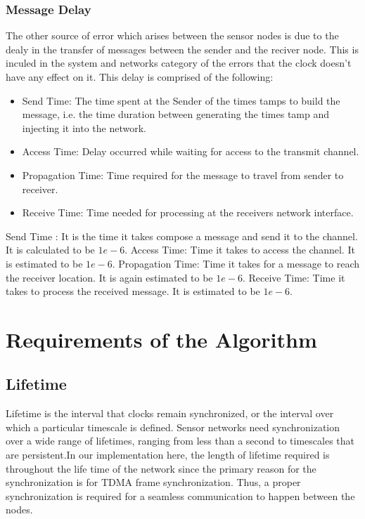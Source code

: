 \documentclass[a4paper,8pt]{report}
\begin{document}
\subsubsection{Message Delay} The other source of error which arises
between the sensor nodes is due to the dealy in the transfer of
messages between the sender and the reciver node. This is inculed in
the system and networks category of the errors that the clock
doesn't have any effect on it. This delay is comprised of the
following:
\begin{itemize}
         \item Send Time: The time spent at the Sender of the times tamps to build the
          message, i.e. the time duration between generating the times tamp and injecting
            it into the network.
         \item Access Time: Delay occurred while waiting for access to the transmit channel.
         \item Propagation Time: Time required for the message to travel from sender to
            receiver.
         \item Receive Time: Time needed for processing at the receivers network interface.
\end{itemize}
Send Time : It is the time it takes compose a message and send it to
the channel. It is calculated to be $1e-6$. \newline Access Time:
Time it takes to access the channel. It is estimated to be $1e-6$.
\newline Propagation Time: Time it takes for a message to reach the
receiver location. It is again estimated to be $1e-6$. Receive Time:
Time it takes to process the received message. It is estimated to be
$1e-6$.
\section{Requirements of the Algorithm}
\subsection{Lifetime}
Lifetime is the interval that clocks remain synchronized, or the
interval over which a particular timescale is defined. Sensor
networks need synchronization over a wide range of lifetimes,
ranging from less than a second to timescales that are
persistent.\newline In our implementation here, the length of
lifetime required is throughout the life time of the network since
the primary reason for the synchronization is for TDMA frame
synchronization. Thus, a proper synchronization is required for a
seamless communication to happen between the nodes.
\end{document}
